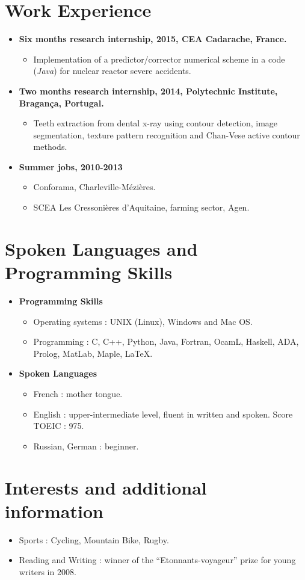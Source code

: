 \documentclass{article}
\begin{document}
\section*{Work Experience}
\begin{itemize}
	\item \textbf{Six months research internship, 2015, CEA Cadarache, France.}
		\begin{itemize}
			\item Implementation of a predictor/corrector numerical scheme in a code (\textit{Java}) for nuclear reactor severe accidents.
		\end{itemize}
	\item \textbf{Two months research internship, 2014, Polytechnic Institute, Bragança, Portugal.}
		\begin{itemize}
			\item Teeth extraction from dental x-ray using contour detection, image segmentation, texture pattern recognition and Chan-Vese active contour methods.
		\end{itemize}
	\item \textbf{Summer jobs, 2010-2013}
		\begin{itemize}
			\item Conforama, Charleville-Mézières.
			\item SCEA Les Cressonières d'Aquitaine, farming sector, Agen.
		\end{itemize}
\end{itemize}  

\section*{Spoken Languages and Programming Skills}
\begin{itemize}
	\item \textbf{Programming Skills}
		\begin{itemize}
			\item Operating systems : UNIX (Linux), Windows and Mac OS.
			\item Programming : C, C++, Python, Java, Fortran, OcamL, Haskell, ADA, Prolog, MatLab, Maple, \LaTeX. 
		\end{itemize}
	\item \textbf{Spoken Languages}
		\begin{itemize}
			\item French : mother tongue.
			\item English : upper-intermediate level, fluent in written and spoken. Score TOEIC : 975.
			\item Russian, German : beginner.
		\end{itemize}
\end{itemize}  

\section*{Interests and additional information}
\begin{itemize}
	\item Sports : Cycling, Mountain Bike, Rugby.
	\item Reading and Writing : winner of the ``Etonnants-voyageur'' prize for young writers in 2008.
\end{itemize}  
\end{document}
